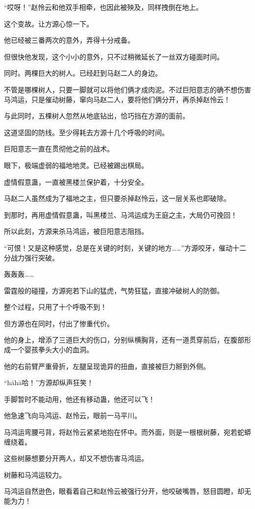 \begin{this_body}
“哎呀！”赵怜云和他双手相牵，也因此被殃及，同样拽倒在地上。

这个变故。让方源心惊一下。

他已经被三番两次的意外，弄得十分戒备。

但很快他发现，这个小小的意外，只不过稍微延长了一丝双方碰面时间。

同时。两棵巨大的树人。已经赶到马赵二人的身边。

不管是哪棵树人，只要一脚就可以将他们俩才成肉泥。不过巨阳意志的确不想伤害马鸿运，只是催动树藤，窜向马赵二人，要将他们俩分开，再杀掉赵怜云！

与此同时，五棵树人忽然从地底钻出，恰巧挡在方源的面前。

这道坚固的防线。至少得耗去方源十几个呼吸的时间。

巨阳意志一直在贯彻他之前的战术。

眼下，极端虚弱的福地地灵。已经被踢出棋局。

虚情假意蛊，一直被黑楼兰保护着，十分安全。

马赵二人虽然成为了福地之主，但只要杀掉赵怜云，这一层关系也即破除。

到那时，再用虚情假意蛊，叫黑楼兰、马鸿运成为王庭之主，大局仍可挽回！

所以此刻，方源来杀马鸿运，被巨阳意志阻挡。

“可恨！又是这种感觉，总是在关键的时刻，关键的地方……”方源咬牙，催动十二分战力强行突破。

轰轰轰……

雷霆般的碰撞，方源宛若下山的猛虎，气势狂猛，直接冲破树人的防御。

整个过程，只用了十个呼吸不到！

但方源也在同时，付出了惨重代价。

他的身上，增添了三道巨大的伤口，分别纵横胸背，还有一道贯穿前后，在腹部形成一个婴孩拳头大小的血洞。

他的右前臂严重骨折，左腿呈现诡异的扭曲，直接被巨力掰到外侧。

“hāhā哈！”方源却纵声狂笑！

手脚暂时不能动用，他还有移动蛊，他还可以飞！

他急速飞向马鸿运、赵怜云，眼前一马平川。

马鸿运弯腰弓背，将赵怜云紧紧地抱在怀中。而外面，则是一根根树藤，宛若蛇蟒缠绕着。

这些树藤想要分开两人，却又不想伤害马鸿运。

树藤和马鸿运较力。

马鸿运自然逊色，眼看着自己和赵怜云被强行分开，他咬破嘴唇，怒目圆瞪，却无能为力！


\end{this_body}
